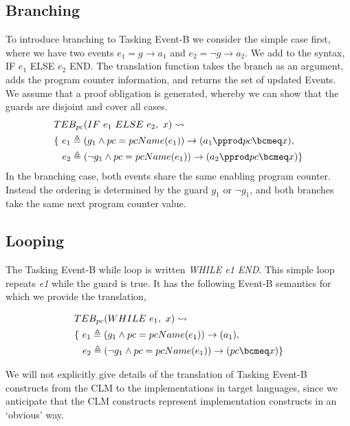 \subsection{Branching}
To introduce branching to Tasking Event-B we consider the simple case first, where we have two events $e_1 = g \rightarrow a_1$ and $e_2 = \lnot g \rightarrow a_2$. We add to the syntax, IF $e_1$ ELSE $e_2$ END. The translation function takes the branch as an argument, adds the program counter information, and returns the set of updated Events. We assume that a proof obligation is generated, whereby we can show that the guards are disjoint and cover all cases.
%
\begin{equation}
\begin{split}
&TEB_{pc}(IF~ e_1~ ELSE~ e_2,~  x) \leadsto\\
& \{~ e_1 \triangleq (g_1 \land pc = pcName(e_1)) \rightarrow (a_1 \pprod pc \bcmeq x),\\
&\hspace*{0.3cm}e_2 \triangleq (\lnot g_1 \land pc = pcName(e_1)) \rightarrow (a_2 \pprod pc \bcmeq x) \}
\end{split}
\notag
\end{equation}
%
In the branching case, both events share the same enabling program counter. Instead the ordering is determined by the guard $g_1$ or $\lnot g_1$, and both branches take the same next program counter value. 

\subsection{Looping}
The Tasking Event-B while loop is written \emph{WHILE e1 END}. This simple loop repeats \emph{e1} while the guard is true. It has the following Event-B semantics for which we provide the translation,

\begin{equation}
\begin{split}
&TEB_{pc}(WHILE~ e_1,~  x) \leadsto\\
& \{~ e_1 \triangleq (g_1 \land pc = pcName(e_1)) \rightarrow (a_1 ),\\
&\hspace*{0.3cm}e_2 \triangleq (\lnot g_1 \land pc = pcName(e_1)) \rightarrow (pc \bcmeq x) \}
\end{split}
\notag
\end{equation}


We will not explicitly give details of the translation of Tasking Event-B constructs from the CLM to the implementations in target languages, since we anticipate that the CLM constructs represent implementation constructs in an `obvious' way. 

